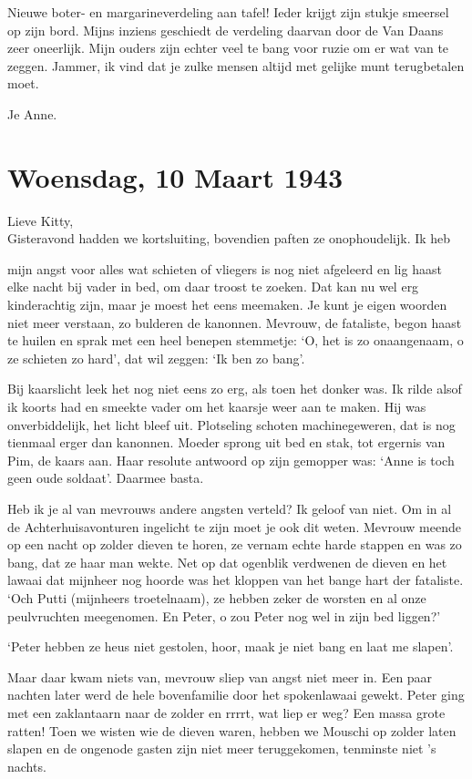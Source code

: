 \documentclass{book}
\begin{document}
Nieuwe boter- en margarineverdeling aan tafel! Ieder krijgt zijn stukje
smeersel op zijn bord. Mijns inziens geschiedt de verdeling daarvan door
de Van Daans zeer oneerlijk. Mijn ouders zijn echter veel te bang voor
ruzie om er wat van te zeggen. Jammer, ik vind dat je zulke mensen
altijd met gelijke munt terugbetalen moet.

Je Anne.

\chapter{Woensdag, 10 Maart 1943}

Lieve Kitty,\\Gisteravond hadden we kortsluiting, bovendien paften ze
onophoudelijk. Ik heb

mijn angst voor alles wat schieten of vliegers is nog niet afgeleerd en
lig haast elke nacht bij vader in bed, om daar troost te zoeken. Dat kan
nu wel erg kinderachtig zijn, maar je moest het eens meemaken. Je kunt
je eigen woorden niet meer verstaan, zo bulderen de kanonnen. Mevrouw,
de fataliste, begon haast te huilen en sprak met een heel benepen
stemmetje: `O, het is zo onaangenaam, o ze schieten zo hard', dat wil
zeggen: `Ik ben zo bang'.

Bij kaarslicht leek het nog niet eens zo erg, als toen het donker was.
Ik rilde alsof ik koorts had en smeekte vader om het kaarsje weer aan te
maken. Hij was onverbiddelijk, het licht bleef uit. Plotseling schoten
machinegeweren, dat is nog tienmaal erger dan kanonnen. Moeder sprong
uit bed en stak, tot ergernis van Pim, de kaars aan. Haar resolute
antwoord op zijn gemopper was: `Anne is toch geen oude soldaat'. Daarmee
basta.

Heb ik je al van mevrouws andere angsten verteld? Ik geloof van niet. Om
in al de Achterhuisavonturen ingelicht te zijn moet je ook dit weten.
Mevrouw meende op een nacht op zolder dieven te horen, ze vernam echte
harde stappen en was zo bang, dat ze haar man wekte. Net op dat ogenblik
verdwenen de dieven en het lawaai dat mijnheer nog hoorde was het
kloppen van het bange hart der fataliste. `Och Putti (mijnheers
troetelnaam), ze hebben zeker de worsten en al onze peulvruchten
meegenomen. En Peter, o zou Peter nog wel in zijn bed liggen?'

`Peter hebben ze heus niet gestolen, hoor, maak je niet bang en laat me
slapen'.

Maar daar kwam niets van, mevrouw sliep van angst niet meer in. Een paar
nachten later werd de hele bovenfamilie door het spokenlawaai gewekt.
Peter ging met een zaklantaarn naar de zolder en rrrrt, wat liep er weg?
Een massa grote ratten! Toen we wisten wie de dieven waren, hebben we
Mouschi op zolder laten slapen en de ongenode gasten zijn niet meer
teruggekomen, tenminste niet 's nachts.
\end{document}
